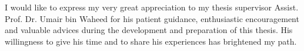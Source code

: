 I would like to express my very great appreciation to my thesis supervisor Assist. Prof. Dr. Umair bin Waheed for his patient guidance, enthusiastic encouragement and valuable advices during the development and preparation of this thesis. His willingness to give his time and to share his experiences has brightened my path.

